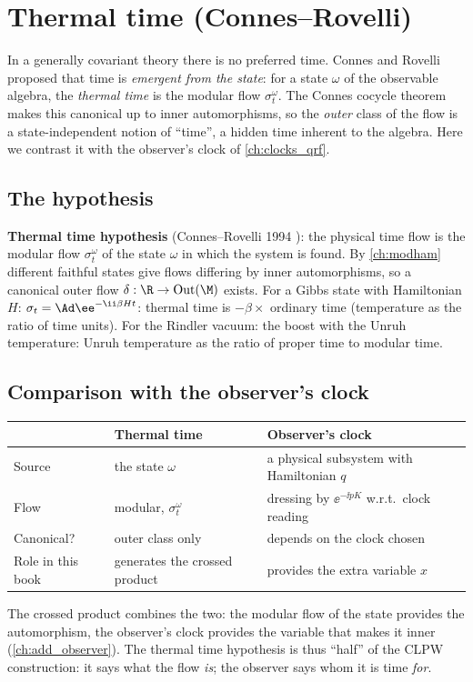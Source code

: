\chapter{Thermal time (Connes--Rovelli)}\label{ch:thermal_time}
\skippable

\begin{physmotiv}
In a generally covariant theory there is no preferred time. Connes and Rovelli proposed that time is \emph{emergent from the state}: for a state $\omega$ of the observable algebra, the \emph{thermal time} is the modular flow $\sigma^\omega_t$. The Connes cocycle theorem makes this canonical up to inner automorphisms, so the \emph{outer} class of the flow is a state-independent notion of ``time'', a hidden time inherent to the algebra. Here we contrast it with the observer's clock of \cref{ch:clocks_qrf}.
\end{physmotiv}

\section{The hypothesis}

\textbf{Thermal time hypothesis} (Connes--Rovelli 1994 \cite{ConnesRovelli1994}): the physical time flow is the modular flow $\sigma^\omega_t$ of the state $\omega$ in which the system is found. By \cref{ch:modham} different faithful states give flows differing by inner automorphisms, so a canonical outer flow $\delta:\R\to\mathrm{Out}(\M)$ exists. For a Gibbs state with Hamiltonian $H$: $\sigma_t=\Ad\ee^{-\ii\beta Ht}$: thermal time is $-\beta\times$ ordinary time (temperature as the ratio of time units). For the Rindler vacuum: the boost with the Unruh temperature: Unruh temperature as the ratio of proper time to modular time.

\section{Comparison with the observer's clock}

\begin{center}
\renewcommand{\arraystretch}{1.3}
\begin{tabular}{@{}p{3.2cm}p{4.8cm}p{4.8cm}@{}}
\toprule
 & Thermal time & Observer's clock\\
\midrule
Source & the state $\omega$ & a physical subsystem with Hamiltonian $q$\\
Flow & modular, $\sigma_t^\omega$ & dressing by $\ee^{-\ii pK}$ w.r.t.\ clock reading\\
Canonical? & outer class only & depends on the clock chosen\\
Role in this book & generates the crossed product & provides the extra variable $x$\\
\bottomrule
\end{tabular}
\end{center}
The crossed product combines the two: the modular flow of the state provides the automorphism, the observer's clock provides the variable that makes it inner (\cref{ch:add_observer}). The thermal time hypothesis is thus ``half'' of the CLPW construction: it says what the flow \emph{is}; the observer says whom it is time \emph{for}.

